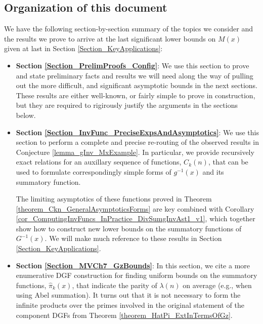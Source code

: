 \documentclass[11pt,reqno,a4letter]{article}
\numberwithin{figure}{section}
\numberwithin{table}{section}
\theoremstyle{plain}
\numberwithin{theorem}{section}
\theoremstyle{definition}
\begin{document}
\subsection{Organization of this document} 

We have the following section-by-section summary of the topics we consider and the 
results we prove to arrive at the last significant lower bounds on 
$M(x)$ given at last in Section \ref{Section_KeyApplications}: 
\begin{itemize} 
     \item \textbf{Section \ref{Section_PrelimProofs_Config}}: 
           We use this section to prove and state preliminary facts and results we will need along the 
           way of pulling out the more difficult, and significant asymptotic bounds in the next sections. 
           These results are either well-known, or fairly simple to prove in construction, but they are 
           required to rigirously justify the arguments in the sections below. 
     \item \textbf{Section \ref{Section_InvFunc_PreciseExpsAndAsymptotics}}: 
           We use this section to perform a complete and precise re-routing of the observed results in 
           Conjecture \ref{lemma_gInv_MxExample}. 
           In particular, we provide recursively exact relations for an auxillary 
           sequence of functions, $C_k(n)$, that can be used to formulate correspondingly simple forms 
           of $g^{-1}(x)$ and its summatory function. 
           
           The limiting asymptotics of these functions 
           proved in Theorem \ref{theorem_Ckn_GeneralAsymptoticsForms} are key combined with 
           Corollary \ref{cor_ComputingInvFuncs_InPractice_DivSumgInvAst1_v1}, 
           which together show how to construct new lower bounds on the 
           summatory functions of $G^{-1}(x)$. We will make much reference to these results in 
           Section \ref{Section_KeyApplications}. 
     \item \textbf{Section \ref{Section_MVCh7_GzBounds}}: 
           In this section, we cite a more enumerative DGF construction for finding uniform bounds 
           on the summatory functions, $\widehat{\pi}_k(x)$, that indicate the parity of $\lambda(n)$ 
           on average (e.g., when using Abel summation). 
           It turns out that it is not necessary to form the infinite products over the primes 
           involved in the original statement of the component DGFs from 
           Theorem \ref{theorem_HatPi_ExtInTermsOfGz}. 
           

\end{itemize}
\end{document}
